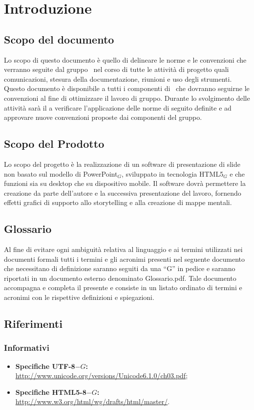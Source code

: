 \section{Introduzione}

\subsection{Scopo del documento}
Lo scopo di questo documento è quello di delineare le norme e le convenzioni che verranno seguite dal gruppo \gruppo\ nel corso di tutte le attività di progetto quali comunicazioni, stesura della documentazione, riunioni e uso degli strumenti.
Questo documento è disponibile a tutti i componenti di \gruppo\ che dovranno seguirne le convenzioni al fine di ottimizzare il lavoro di gruppo.
Durante lo svolgimento delle attività sarà il \ruoloResponsabile a verificare l’applicazione delle norme di seguito definite e ad approvare nuove convenzioni proposte dai componenti del gruppo.

\subsection{Scopo del Prodotto}
Lo scopo del progetto è la realizzazione di un software di presentazione di slide non basato sul modello di PowerPoint$_G$, sviluppato in tecnologia HTML5$_G$ e che funzioni sia su desktop che su dispositivo mobile. Il software dovrà permettere la creazione da parte dell'autore e la successiva presentazione del lavoro, fornendo effetti grafici di supporto allo storytelling e alla creazione di mappe mentali. 

\subsection{Glossario}
Al fine di evitare ogni ambiguità relativa al linguaggio e ai termini utilizzati nei documenti formali tutti i termini e gli acronimi presenti nel seguente documento che necessitano di definizione saranno seguiti da una ``G'' in pedice e saranno riportati in un documento esterno denominato Glossario.pdf. Tale documento accompagna e completa il presente e consiste in un listato ordinato di termini e acronimi con le rispettive definizioni e spiegazioni.

\subsection{Riferimenti}
\subsubsection{Informativi}
\begin{itemize}
	\item \textbf{Specifiche UTF-8$-G$:} \href{http://www.unicode.org/versions/Unicode6.1.0/ch03.pdf}{http://www.unicode.org/versions/Unicode6.1.0/ch03.pdf};
	\item \textbf{Specifiche HTML5-8$-G$:} \href{http://www.w3.org/html/wg/drafts/html/master/}{http://www.w3.org/html/wg/drafts/html/master/}.
\end{itemize}